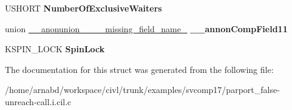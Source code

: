 \begin{DoxyCompactItemize}
\item 
\hypertarget{struct__ERESOURCE_a02ba48ccfed5543850eb829ece5a5956}{}U\+S\+H\+O\+R\+T {\bfseries Number\+Of\+Exclusive\+Waiters}\label{struct__ERESOURCE_a02ba48ccfed5543850eb829ece5a5956}

\item 
\hypertarget{struct__ERESOURCE_a755586bc11db68a1e10b26f89d722d63}{}union \hyperlink{union____anonunion________missing__field__name__39}{\+\_\+\+\_\+anonunion\+\_\+\+\_\+\+\_\+\+\_\+missing\+\_\+field\+\_\+name\+\_} {\bfseries \+\_\+\+\_\+annon\+Comp\+Field11}\label{struct__ERESOURCE_a755586bc11db68a1e10b26f89d722d63}

\item 
\hypertarget{struct__ERESOURCE_aac55125cfe26c5571cbfd56fa0479604}{}K\+S\+P\+I\+N\+\_\+\+L\+O\+C\+K {\bfseries Spin\+Lock}\label{struct__ERESOURCE_aac55125cfe26c5571cbfd56fa0479604}

\end{DoxyCompactItemize}


The documentation for this struct was generated from the following file\+:\begin{DoxyCompactItemize}
\item 
/home/arnabd/workspace/civl/trunk/examples/svcomp17/parport\+\_\+false-\/unreach-\/call.\+i.\+cil.\+c\end{DoxyCompactItemize}
